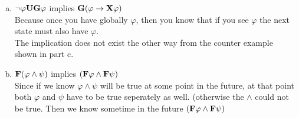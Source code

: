 \documentclass[11pt,leqno,fleqn]{article}
\begin{document}
\begin{enumerate}[(a)]
\begin{enumerate}[(a)]
\item $\neg \varphi \bold{UG} \varphi $ implies  $ \bold{G}(\varphi \to \bold{X} \varphi)$
\\ Because once you have globally $\varphi$, then you know that if you see $\varphi$ the next state must also have $\varphi$.
\\ The implication does not exist the other way from the counter example shown in part c.

\item  $\bold{F}(\varphi \land \psi)$ implies $( \bold{F} \varphi \land \bold{F} \psi)$
\\ Since if we know $\varphi \land \psi$ will be true at some point in the future, at that point both $\varphi$ and $\psi$ have to be true seperately as well. (otherwise the $\land$ could not be true. Then we know sometime in the future $( \bold{F} \varphi \land \bold{F} \psi)$
 \end{enumerate}

 \end{enumerate}
 
 \newpage
\end{document}
